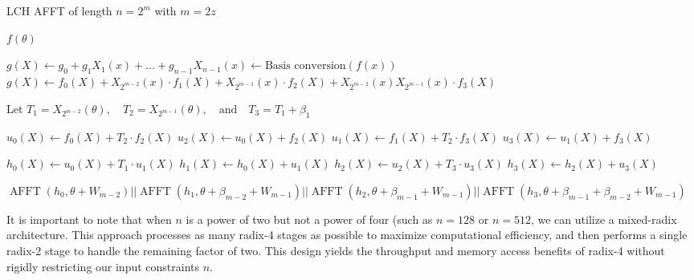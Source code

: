 \documentclass[11pt,runningheads]{llncs}
\DeclareMathOperator{\fft}{AFFT} %
\begin{document}
\begin{algorithm}[H]
    \caption{LCH AFFT of length $n = 2^m$ with $m=2z$}\label{Algo:LCHRadix4}
    \SetAlgoLined
    { \scriptsize
    \KwOut{$\fft(f, \theta+W_m)$.}

    {
        \Return $f(\theta)$\;
    }
    
    $g(X) \gets g_0 + g_1 X_1(x) + \dots + g_{n-1} X_{n-1}(x) \leftarrow \text{Basis conversion}(f(x))$\;
    $g(X) \gets f_0(X) + X_{2^{m-2}}(x) \cdot f_1(X) + X_{2^{m-1}}(x) \cdot f_2(X) + X_{2^{m-2}}(x) X_{2^{m-1}}(x) \cdot f_3(X)$\;

    Let $T_1 = X_{2^{m-2}}(\theta), \quad T_2= X_{2^{m-1}}(\theta), \quad \text{and} \quad T_3 = T_1 + \beta_1$ 

    $u_0(X) \gets f_0(X) + T_2 \cdot f_2(X)$\;
    $u_2(X) \gets u_0(X) + f_2(X)$\;
    $u_1(X) \gets f_1(X) + T_2 \cdot f_3(X)$\;
    $u_3(X) \gets u_1(X) + f_3(X)$\;
    
    $h_0(X) \gets u_0(X) + T_1 \cdot u_1(X)$\;
    $h_1(X) \gets h_0(X) + u_1(X)$\;
    $h_2(X) \gets u_2(X) + T_3 \cdot u_3(X)$\;
    $h_3(X) \gets h_2(X) + u_3(X)$\;
    
    \Return $\fft(h_0,\theta+W_{m-2})||\fft(h_1, \theta+\beta_{m-2}+ W_{m-1})||\fft(h_2, \theta+\beta_{m-1}+ W_{m-1})||\fft(h_3, \theta+\beta_{m-1}+\beta_{m-2}+ W_{m-1})$\;
    }
\end{algorithm}






















\begin{remark}
    It is important to note that when $n$ is a power of two but not a power of four (such as $n=128$ or $n=512$, we can utilize a mixed-radix architecture. This approach processes as many radix-4 stages as possible to maximize computational efficiency, and then performs a single radix-2 stage to handle the remaining factor of two. This design yields the throughput and memory access benefits of radix-4 without rigidly restricting our input constraints $n$.
\end{remark}
\end{document}
